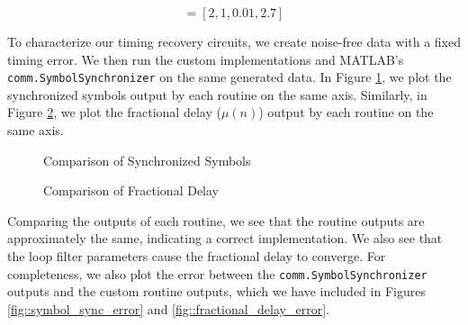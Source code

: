 \documentclass{article}
\begin{document}
\begin{equation*}
	[N, \zeta, B_{loop}, G_D] = [2, 1, 0.01, 2.7]
\end{equation*}

\noindent To characterize our timing recovery circuits, we create noise-free data with a fixed timing error. We then run the custom implementations and MATLAB's \texttt{comm.SymbolSynchronizer} on the same generated data. In Figure \ref{fig::symbol_sync_no_noise}, we plot the synchronized symbols output by each routine on the same axis. Similarly, in Figure \ref{fig::fractional_delay_no_noise}, we plot the fractional delay ($\mu(n)$) output by each routine on the same axis.

\begin{figure}[H]
	\centerline{}
	\caption{Comparison of Synchronized Symbols}
	\label{fig::symbol_sync_no_noise}
\end{figure}

\begin{figure}[H]
	\centerline{}
	\caption{Comparison of Fractional Delay}
	\label{fig::fractional_delay_no_noise}
\end{figure}

\noindent Comparing the outputs of each routine, we see that the routine outputs are approximately the same, indicating a correct implementation. We also see that the loop filter parameters cause the fractional delay to converge. For completeness, we also plot the error between the \texttt{comm.SymbolSynchronizer} outputs and the custom routine outputs, which we have included in Figures \ref{fig::symbol_sync_error} and \ref{fig::fractional_delay_error}.
\end{document}
